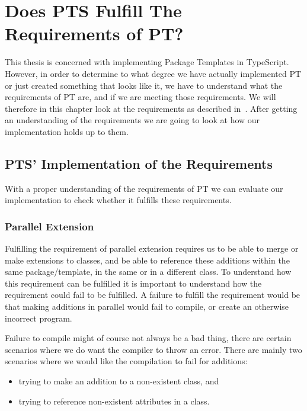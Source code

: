 \section{Does PTS Fulfill The Requirements of PT?}\label{sec:does-pts-fulfill-the-requirements-of-pt?}

This thesis is concerned with implementing Package Templates in TypeScript.
However, in order to determine to what degree we have actually implemented PT or just created something that looks like it, we have to understand what the requirements of PT are, and if we are meeting those requirements.
We will therefore in this chapter look at the requirements as described in~\cite{jot}.
After getting an understanding of the requirements we are going to look at how our implementation holds up to them.



\subsection{PTS' Implementation of the Requirements}\label{subsec:pts'-implementation-of-the-requirements}

With a proper understanding of the requirements of PT we can evaluate our implementation to check whether it fulfills these requirements.

\subsubsection{Parallel Extension}\label{subsubsec:pts-parallel-extension}

Fulfilling the requirement of parallel extension requires us to be able to merge or make extensions to classes, and be able to reference these additions within the same package/template, in the same or in a different class.
To understand how this requirement can be fulfilled it is important to understand how the requirement could fail to be fulfilled.
A failure to fulfill the requirement would be that making additions in parallel would fail to compile, or create an otherwise incorrect program.

Failure to compile might of course not always be a bad thing, there are certain scenarios where we do want the compiler to throw an error.
There are mainly two scenarios where we would like the compilation to fail for additions:
\begin{itemize}
    \item trying to make an addition to a non-existent class, and
    \item trying to reference non-existent attributes in a class.
\end{itemize}

